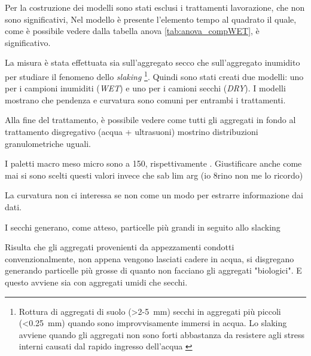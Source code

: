 \documentclass[11pt, a4paper, openright, titlepage, final, language = italian]{book}
\begin{document}
   
 



Per la costruzione dei modelli sono stati esclusi i trattamenti
lavorazione, che non sono significativi, Nel modello \`e presente
l'elemento tempo al quadrato il quale, come \`e possibile vedere dalla
tabella anova \ref{tab:anova_compWET}, \`e significativo.

La misura \`e stata effettuata sia sull'aggregato secco che
sull'aggregato inumidito per studiare il fenomeno dello
\emph{slaking} \footnote{Rottura di
aggregati di suolo (>2-\SI{5}{\mm}) secchi in aggregati pi\`u piccoli
(<\SI{0.25}{\mm}) quando sono improvvisamente immersi in acqua. Lo
slaking avviene quando gli aggregati non sono forti abbastanza da
resistere agli stress interni causati dal rapido ingresso dell'acqua
\citep{Slaking}}.    Quindi sono stati creati due modelli: uno
per i campioni inumiditi (\emph{WET}) e uno per i camioni secchi
(\emph{DRY}). I modelli mostrano che pendenza e curvatura sono comuni
per entrambi i trattamenti.

Alla fine del trattamento, \`e possibile vedere come tutti gli
aggregati in fondo al trattamento disgregativo (acqua + ultrasuoni)
mostrino distribuzioni granulometriche uguali.

I paletti macro meso micro sono a 150, rispettivamente
. Giustificare anche come mai si
sono scelti questi valori invece che sab lim arg (io 8rino non me lo
ricordo)

La curvatura non ci interessa se non come un modo per estrarre
informazione dai dati.

I secchi generano, come atteso, particelle più grandi in seguito allo
slacking 
  
Risulta che gli aggregati provenienti da appezzamenti condotti
convenzionalmente, non appena vengono lasciati cadere in acqua, si
disgregano generando particelle più grosse di quanto non facciano gli
aggregati "biologici". E questo avviene sia con aggregati umidi che
secchi.
\end{document}

